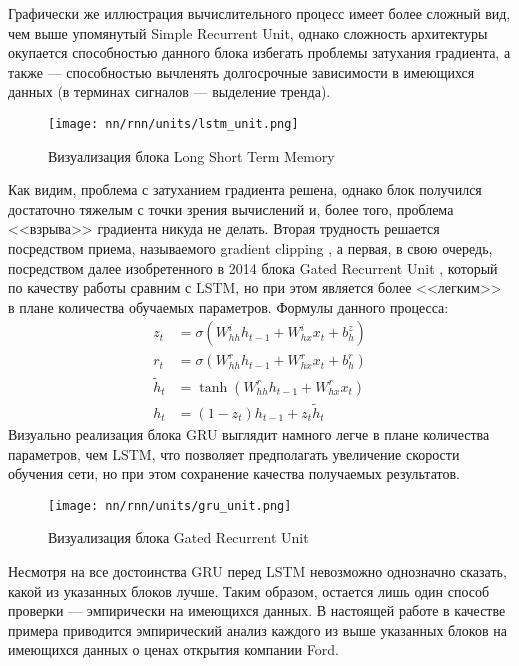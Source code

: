 \noindent Графически же иллюстрация вычислительного процесс имеет более сложный вид, чем выше упомянутый Simple Recurrent Unit, однако сложность архитектуры окупается способностью данного блока избегать проблемы затухания градиента, а также --- способностью вычленять долгосрочные зависимости в имеющихся данных (в терминах сигналов --- выделение тренда).
\begin{figure}[H]
	\centering
	\texttt{[image: nn/rnn/units/lstm\_unit.png]}
	\caption{Визуализация блока Long Short Term Memory}
	\label{fig::lstm_unit}
\end{figure}
Как видим, проблема с затуханием градиента решена, однако блок получился достаточно тяжелым с точки зрения вычислений и, более того, проблема <<взрыва>> градиента никуда не делать. Вторая трудность решается посредством приема, называемого gradient clipping \cite{mikolov2012statistical}, а первая, в свою очередь, посредством далее изобретенного в 2014 блока Gated Recurrent Unit \cite{cho2014learning}, который по качеству работы сравним с LSTM, но при этом является более <<легким>> в плане количества обучаемых параметров. Формулы данного процесса:
\begin{equation}
	\begin{split}
		z_t & = \sigma\left(W_{hh}^i h_{t - 1} + W_{hx}^i x_t + b_h^z\right)\\
		r_t & = \sigma\left(W_{hh}^r h_{t - 1} + W_{hx}^r x_t + b_h^r\right)\\
		\tilde{h}_t & = \tanh \left(W_{hh}^r h_{t - 1} + W_{hx}^r x_t\right)\\
		h_t & = (1 - z_t) h_{t - 1} + z_t \tilde{h}_t
	\end{split}
\end{equation}
\noindent Визуально реализация блока GRU выглядит намного легче в плане количества параметров, чем LSTM, что позволяет предполагать увеличение скорости обучения сети, но при этом сохранение качества получаемых результатов.
\begin{figure}[H]
	\centering
	\texttt{[image: nn/rnn/units/gru\_unit.png]}
	\caption{Визуализация блока Gated Recurrent Unit}
	\label{fig::gru_unit}
\end{figure}
Несмотря на все достоинства GRU перед LSTM невозможно однозначно сказать, какой из указанных блоков лучше. Таким образом, остается лишь один способ проверки --- эмпирически на имеющихся данных. В настоящей работе в качестве примера приводится эмпирический анализ каждого из выше указанных блоков на имеющихся данных о ценах открытия компании Ford.

